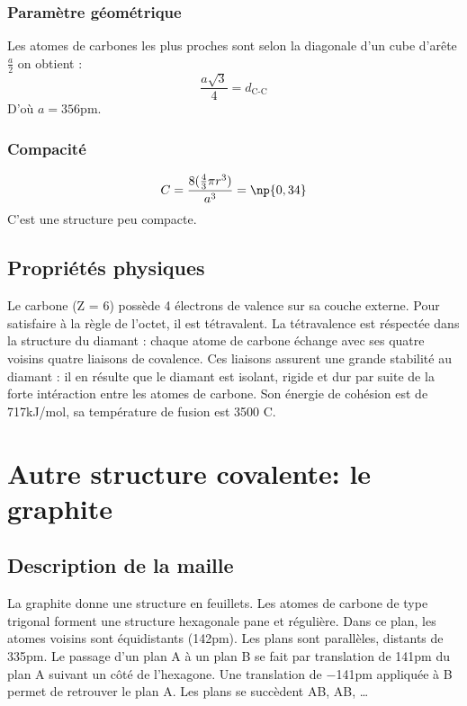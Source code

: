 \subsubsection{Paramètre géométrique}
Les atomes de carbones les plus proches sont selon la diagonale d’un cube d’arête
$\frac{a}{2}$ on obtient :
\begin{equation}
    \frac{a\sqrt{3}}{4} = d_\text{C-C}
\end{equation}
D'où $a = 356$pm.

\subsubsection{Compacité} 
\begin{equation}
    C = \frac{8(\frac{4}{3}\pi r^3)}{a^3} = \np{0,34}
\end{equation}
C'est une structure peu compacte.


\subsection{Propriétés physiques}
Le carbone (Z = 6) possède 4 électrons de valence sur sa couche externe. Pour
satisfaire à la règle de l’octet, il est tétravalent. La tétravalence est réspectée dans la structure
du diamant : chaque atome de carbone échange avec ses quatre voisins quatre liaisons
de covalence. Ces liaisons assurent une grande stabilité au diamant : il en résulte que
le diamant est isolant, rigide et dur par suite de la forte intéraction entre les atomes de
carbone.
Son énergie  
de cohésion est de 717kJ/mol, sa température 
de fusion est 3500
\degre C.


\section{Autre structure covalente: le graphite}
\subsection{Description de la maille}
La graphite donne une structure en feuillets. Les atomes de carbone de type trigonal
forment une structure hexagonale pane et régulière. Dans ce plan, les atomes voisins
sont équidistants (142pm). Les plans sont parallèles, distants de 335pm. Le passage
d’un plan A à un plan B se fait par translation de 141pm du plan A suivant un côté de
l’hexagone. Une translation de $-$141pm appliquée à B permet de retrouver le plan A.
Les plans se succèdent AB, AB, \dots


